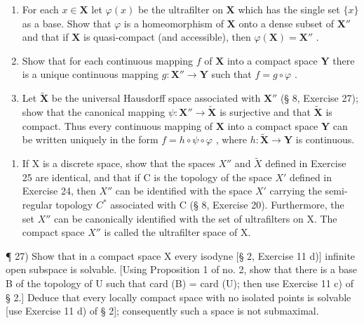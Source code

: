 \begin{enumerate}
\def\labelenumi{\alph{enumi})}
\setcounter{enumi}{2}
\item
  For each \(x \in \mathbf{X}\) let \(\varphi(x)\) be the ultrafilter on \(\mathbf{X}\) which has the single set \(\{x\}\) as a base. Show that \(\varphi\) is a homeomorphism of \(\mathbf{X}\) onto a dense subset of \(\mathbf{X}''\) and that if \(\mathbf{X}\) is quasi-compact (and accessible), then \(\varphi(\mathbf{X}) = \mathbf{X}''\) .
\item
  Show that for each continuous mapping \(f\) of \(\mathbf{X}\) into a compact space \(\mathbf{Y}\) there is a unique continuous mapping \(g: \mathbf{X}'' \to \mathbf{Y}\) such that \(f = g \circ \varphi\) .
\item
  Let \(\tilde{\mathbf{X}}\) be the universal Hausdorff space associated with \(\mathbf{X}''\) (§ 8, Exercise 27); show that the canonical mapping \(\psi: \mathbf{X}'' \to \tilde{\mathbf{X}}\) is surjective and that \(\tilde{\mathbf{X}}\) is compact. Thus every continuous mapping of \(\mathbf{X}\) into a compact space \(\mathbf{Y}\) can be written uniquely in the form \(f = h \circ \psi \circ \varphi\) , where \(h: \tilde{\mathbf{X}} \to \mathbf{Y}\) is continuous.
\end{enumerate}

\begin{enumerate}
\def\labelenumi{\arabic{enumi})}
\setcounter{enumi}{25}
\tightlist
\item
  If X is a discrete space, show that the spaces \(X''\) and \(\tilde{X}\) defined in Exercise 25 are identical, and that if C is the topology of the space \(X'\) defined in Exercise 24, then \(X''\) can be identified with the space \(X'\) carrying the semi-regular topology \(C^*\) associated with C (§ 8, Exercise 20). Furthermore, the set \(X''\) can be canonically identified with the set of ultrafilters on X. The compact space \(X''\) is called the ultrafilter space of X.
\end{enumerate}

¶ 27) Show that in a compact space X every isodyne {[}§ 2, Exercise 11 d){]} infinite open subspace is solvable. {[}Using Proposition 1 of no. 2, show that there is a base B of the topology of U such that card (B) = card (U); then use Exercise 11 c) of § 2.{]} Deduce that every locally compact space with no isolated points is solvable {[}use Exercise 11 d) of § 2{]}; consequently such a space is not submaximal.

